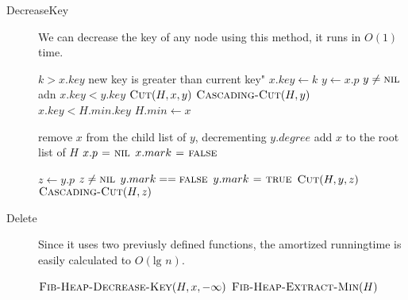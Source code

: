 \begin{description}
\item[DecreaseKey]
  We can decrease the key of any node using this method, it runs in $O(1)$ time.
  \begin{codebox}
    \li \If $k > x.key$ \Do
    \li   \Error new key is greater than current key"\End
    \li $x.key \gets k$
    \li $y \gets x.p$
    \li \If $y \neq \textnormal{\scshape nil}$ adn $x.key < y.key$ \Do
    \li   $\textnormal{\scshape Cut}(H,x,y)$
    \li   $\textnormal{\scshape Cascading-Cut}(H,y)$ \End
    \li \If $x.key < H.min.key$ \Do
    \li   $H.min \gets x$
  \end{codebox}
  \begin{codebox}
    \li remove $x$ from the child list of $y$, decrementing $y.degree$
    \li add $x$ to the root list of $H$
    \li $x.p \mathrel{\hspace{1pt}=\hspace{1pt}} \textnormal{\scshape nil}$
    \li $x.mark \mathrel{\hspace{1pt}=\hspace{1pt}} \textnormal{\scshape false}$
  \end{codebox}
  \begin{codebox}
    \li $z \gets y.p$
    \li \If $z \neq \textnormal{\scshape nil}$ \Do
    \li   \If $y.mark == \textnormal{\scshape false}$ \Do
    \li     $y.mark \mathrel{\hspace{1pt}=\hspace{1pt}} \textnormal{\scshape true}$
    \li   \Else $\textnormal{\scshape Cut}(H,y,z)$
    \li     $\textnormal{\scshape Cascading-Cut}(H,z)$\End
  \end{codebox}


\item[Delete] Since it uses two previusly defined functions, the amortized
  runningtime is easily calculated to $O(\text{lg }n)$.
  \begin{codebox}
    \li $\textnormal{\scshape Fib-Heap-Decrease-Key}(H,x,-\infty)$
    \li $\textnormal{\scshape Fib-Heap-Extract-Min}(H)$
  \end{codebox}
\end{description}


